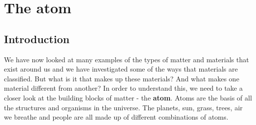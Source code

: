          \chapter{The atom}
\label{chap:atom}
    \label{ea1c9e59656f96ee804546971cf6dee6}
    \label{m38756*cid1}
            \section{Introduction}
            \nopagebreak
      \par \label{m38756*id254141}We have now looked at many examples of the types of matter and materials that exist around us and we have investigated some of the ways that materials are classified. But what is it that makes up these materials? And what makes one material different from another? In order to understand this, we need to take a closer look at the building blocks of matter - the \textbf{atom}. Atoms are the basis of all the structures and organisms in the universe. The planets, sun, grass, trees, air we breathe and people are all made up of different combinations of atoms.\par 
{}
    \label{m38756*eip-613}
